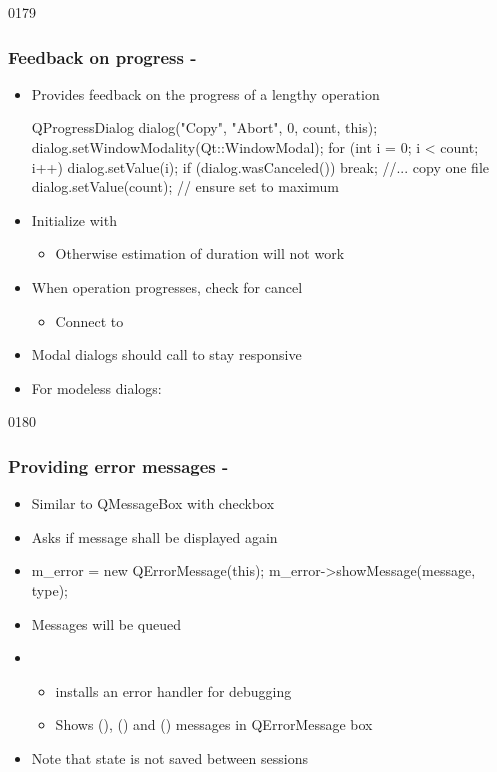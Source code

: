 \begin{slide}[fragile]{0179}
\frametitle{Feedback on progress - }
\begin{itemize}
  \item Provides feedback on the progress of a lengthy operation
   \begin{cpp}
QProgressDialog dialog("Copy", "Abort", 0, count, this);
dialog.setWindowModality(Qt::WindowModal);
for (int i = 0; i < count; i++) {
  dialog.setValue(i);
  if (dialog.wasCanceled()) { break; }
  //... copy one file
}
dialog.setValue(count); // ensure set to maximum      
    \end{cpp}
  \item Initialize with 
    \begin{itemize}
    \item Otherwise estimation of duration will not work
    \end{itemize}
  \item When operation progresses, check for cancel
    \begin{itemize}
    \item Connect to 
    \end{itemize}
  \item Modal dialogs should call  to stay responsive
  \item For modeless dialogs: 
  \end{itemize}
\end{slide}

\begin{slide}[fragile]{0180} 
\frametitle{Providing error messages - }
\label{qerrormessage}
  \begin{itemize}
  \item Similar to QMessageBox with checkbox
  \item Asks if message shall be displayed again
 \item[]
    \begin{cpp}
m_error = new QErrorMessage(this);
m_error->showMessage(message, type);
    \end{cpp}
\item Messages will be queued
  \item {}
    \begin{itemize}
   \item installs an error handler for debugging
    \item Shows (), () and
    () messages in QErrorMessage box
    \end{itemize}
\item Note that state is not saved between sessions
\end{itemize}
\end{slide}


